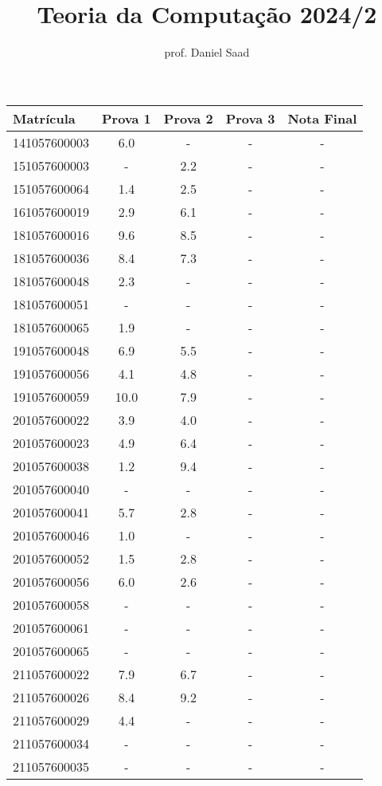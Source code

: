 \documentclass{article}
\title{ Teoria da Computação 2024/2}
\date{}
\author{ prof. Daniel Saad}
\begin{document}
 \maketitle
    \begin{longtable}{|l|c|c|c|c|}
    \hline
Matrícula & Prova 1 & Prova 2 & Prova 3 & Nota Final\\\hline \endhead   
141057600003 & 6.0 & - & - & -\\\hline
151057600003 & - & 2.2 & - & -\\\hline
151057600064 & 1.4 & 2.5 & - & -\\\hline
161057600019 & 2.9 & 6.1 & - & -\\\hline
181057600016 & 9.6 & 8.5 & - & -\\\hline
181057600036 & 8.4 & 7.3 & - & -\\\hline
181057600048 & 2.3 & - & - & -\\\hline
181057600051 & - & - & - & -\\\hline
181057600065 & 1.9 & - & - & -\\\hline
191057600048 & 6.9 & 5.5 & - & -\\\hline
191057600056 & 4.1 & 4.8 & - & -\\\hline
191057600059 & 10.0 & 7.9 & - & -\\\hline
201057600022 & 3.9 & 4.0 & - & -\\\hline
201057600023 & 4.9 & 6.4 & - & -\\\hline
201057600038 & 1.2 & 9.4 & - & -\\\hline
201057600040 & - & - & - & -\\\hline
201057600041 & 5.7 & 2.8 & - & -\\\hline
201057600046 & 1.0 & - & - & -\\\hline
201057600052 & 1.5 & 2.8 & - & -\\\hline
201057600056 & 6.0 & 2.6 & - & -\\\hline
201057600058 & - & - & - & -\\\hline
201057600061 & - & - & - & -\\\hline
201057600065 & - & - & - & -\\\hline
211057600022 & 7.9 & 6.7 & - & -\\\hline
211057600026 & 8.4 & 9.2 & - & -\\\hline
211057600029 & 4.4 & - & - & -\\\hline
211057600034 & - & - & - & -\\\hline
211057600035 & - & - & - & -\\\hline

\end{longtable}
\end{document}
